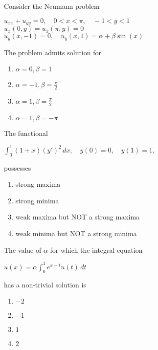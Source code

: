                 \item Consider the Neumann problem 
                \begin{center}
                    $u_{xx} + u_{yy} = 0, \quad 0 < x < \pi, \quad -1 < y < 1$\\
			$u_x(0, y) = u_x(\pi, y) = 0$\\
                    $u_y(x, -1) = 0, \quad u_y(x, 1) = \alpha + \beta \sin(x)$  

                \end{center}
                The problem admits solution for 
                \begin{multicols}{2}
                \begin{enumerate}
                    \item $\alpha=0,\beta=1$
                    \item $\alpha=-1,\beta=\frac{\pi}{2}$
                    \item $\alpha=1,\beta=\frac{\pi}{2}$
                    \item $\alpha=1,\beta=-\pi$
                \end{enumerate}
                    
                \end{multicols}

                \item The functional 
                \begin{center}
                    $\int_{0}^{1} (1+x)(y')^2 \, dx, \quad y(0) = 0, \quad y(1) = 1$,
                \end{center}
                possesses
                \begin{enumerate}
                    \item strong maxima 
                    \item strong minima 
                    \item weak maxima but NOT a strong maxima 
                    \item weak minima but NOT a strong minima 
                \end{enumerate}

                \item The value of $\alpha$ for which the integral equation 
                \begin{center}
                    $u(x) = \alpha \int_{0}^{1} e^{x-t} u(t) \, dt$
                \end{center}
                has a non-trivial solution is 
                \begin{multicols}{4}
                \begin{enumerate}
                    \item $-2$
                    \item $-1$
                    \item $1$
                    \item $2$
                \end{enumerate}
                    
                \end{multicols}

